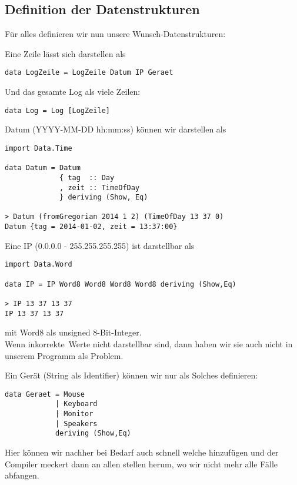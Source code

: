 \documentclass{beamer}
\begin{document}
\subsection{Definition der Datenstrukturen}
\begin{frame}[fragile]
Für alles definieren wir nun unsere Wunsch-Datenstrukturen:\pause
\bigskip

Eine Zeile lässt sich darstellen als
\begin{verbatim}
data LogZeile = LogZeile Datum IP Geraet
\end{verbatim}
\bigskip

Und das gesamte Log als viele Zeilen:
\begin{verbatim}
data Log = Log [LogZeile]
\end{verbatim}
\end{frame}

\begin{frame}[fragile]
Datum (YYYY-MM-DD hh:mm:ss) können wir darstellen als
\begin{verbatim}
import Data.Time

data Datum = Datum
             { tag  :: Day
             , zeit :: TimeOfDay
             } deriving (Show, Eq)

> Datum (fromGregorian 2014 1 2) (TimeOfDay 13 37 0)
Datum {tag = 2014-01-02, zeit = 13:37:00}
\end{verbatim}

\end{frame}

\begin{frame}[fragile]
Eine IP (0.0.0.0 - 255.255.255.255) ist darstellbar als
\begin{verbatim}
import Data.Word

data IP = IP Word8 Word8 Word8 Word8 deriving (Show,Eq)

> IP 13 37 13 37
IP 13 37 13 37
\end{verbatim}
mit Word8 als unsigned 8-Bit-Integer.\\
\pause
Wenn \glqq inkorrekte\grqq\ Werte nicht darstellbar sind, dann haben wir sie auch nicht in unserem Programm als Problem.
\end{frame}

\begin{frame}[fragile]
Ein Gerät (String als Identifier) können wir nur als Solches definieren:
\begin{verbatim}
data Geraet = Mouse 
            | Keyboard 
            | Monitor 
            | Speakers 
            deriving (Show,Eq)
\end{verbatim}
\bigskip

\pause
Hier können wir nachher bei Bedarf auch schnell welche hinzufügen und der Compiler meckert dann an allen stellen herum, wo wir nicht mehr alle Fälle abfangen.
\end{frame}
\end{document}
